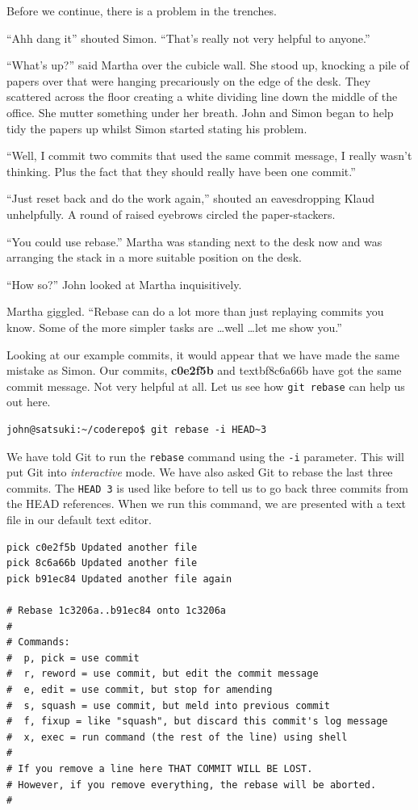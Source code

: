 Before we continue, there is a problem in the trenches.

\begin{trenches}
``Ahh dang it'' shouted Simon.  ``That's really not very helpful to anyone.''

``What's up?'' said Martha over the cubicle wall.  She stood up, knocking a pile of papers over that were hanging precariously on the edge of the desk.  They scattered across the floor creating a white dividing line down the middle of the office.  She mutter something under her breath.  John and Simon began to help tidy the papers up whilst Simon started stating his problem.

``Well, I commit two commits that used the same commit message, I really wasn't thinking.  Plus the fact that they should really have been one commit.''

``Just reset back and do the work again,'' shouted an eavesdropping Klaud unhelpfully.  A round of raised eyebrows circled the paper-stackers.

``You could use rebase.''  Martha was standing next to the desk now and was arranging the stack in a more suitable position on the desk.  

``How so?''  John looked at Martha inquisitively.  

Martha giggled. ``Rebase can do a lot more than just replaying commits you know.  Some of the more simpler tasks are \ldots well \ldots let me show you.''
\end{trenches}

Looking at our example commits, it would appear that we have made the same mistake as Simon.  Our commits, \textbf{c0e2f5b} and textbf{8c6a66b} have got the same commit message.  Not very helpful at all.  Let us see how \texttt{git rebase} can help us out here.

\begin{Verbatim}
john@satsuki:~/coderepo$ git rebase -i HEAD~3 
\end{Verbatim}

We have told Git to run the \texttt{rebase} command using the \texttt{-i} parameter.  This will put Git into \emph{interactive} mode.  We have also asked Git to rebase the last three commits.  The \texttt{HEAD~3} is used like before to tell us to go back three commits from the HEAD references.  When we run this command, we are presented with a text file in our default text editor.

\begin{Verbatim}
pick c0e2f5b Updated another file
pick 8c6a66b Updated another file
pick b91ec84 Updated another file again

# Rebase 1c3206a..b91ec84 onto 1c3206a
#
# Commands:
#  p, pick = use commit
#  r, reword = use commit, but edit the commit message
#  e, edit = use commit, but stop for amending
#  s, squash = use commit, but meld into previous commit
#  f, fixup = like "squash", but discard this commit's log message
#  x, exec = run command (the rest of the line) using shell
#
# If you remove a line here THAT COMMIT WILL BE LOST.
# However, if you remove everything, the rebase will be aborted.
#
\end{Verbatim}

